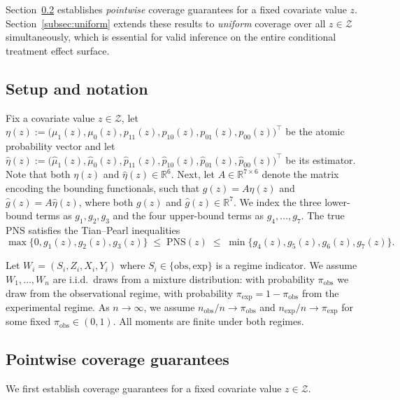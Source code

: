 \documentclass[accepted]{uai2026} %
\theoremstyle{plain}
\theoremstyle{definition}
\theoremstyle{remark}
\begin{document}
Section~\ref{subsec:pointwise} establishes \emph{pointwise} coverage guarantees
for a fixed covariate value $z$. Section~\ref{subsec:uniform} extends these
results to \emph{uniform} coverage over all $z \in \mathcal{Z}$ simultaneously,
which is essential for valid inference on the entire conditional treatment
effect surface.

\subsection{Setup and notation}

Fix a covariate value $z \in \mathcal{Z}$, let $\eta(z) := \bigl(\mu_1(z), \mu_0(z), p_{11}(z), p_{10}(z), p_{01}(z), p_{00}(z) \bigr)^\top$ be the atomic probability vector and let $\hat\eta(z) := \bigl(\hat\mu_1(z), \hat\mu_0(z), \hat p_{11}(z), \hat p_{10}(z), \hat p_{01}(z), \hat p_{00}(z) \bigr)^\top$ be its estimator. Note that both $\eta(z)$ and $\hat{\eta}(z)  \in \mathbb{R}^6$. Next, let $A \in \mathbb{R}^{7\times 6}$ denote the matrix encoding the
\citep[Eq.~(24)]{tian2000probabilities} bounding functionals, such that $g(z) = A\eta(z)$ and $\hat{g}(z) = A\hat{\eta}(z)$, where both $g(z)$ and $\hat{g}(z) \in \mathbb{R}^7$.
We index the three lower-bound terms as $g_1,g_2,g_3$ and the four upper-bound
terms as $g_4,\dots,g_7$. The true PNS satisfies the Tian--Pearl inequalities
\[
  \max\{0,g_1(z),g_2(z),g_3(z)\}
  \;\le\; \mathrm{PNS}(z)
  \;\le\;
  \min\{g_4(z),g_5(z),g_6(z),g_7(z)\}.
\]

Let $W_i = (S_i, Z_i, X_i, Y_i)$ where $S_i \in \{\text{obs}, \text{exp}\}$ is a regime indicator.
We assume $W_1,\dots,W_n$ are i.i.d.\ draws from a mixture distribution: with probability $\pi_{\mathrm{obs}}$ we draw from the observational regime, with probability $\pi_{\mathrm{exp}} = 1 - \pi_{\mathrm{obs}}$ from the experimental regime.
As $n \to \infty$, we assume $n_{\mathrm{obs}}/n \to \pi_{\mathrm{obs}}$ and $n_{\mathrm{exp}}/n \to \pi_{\mathrm{exp}}$ for some fixed $\pi_{\mathrm{obs}} \in (0,1)$.
All moments are finite under both regimes.

\subsection{Pointwise coverage guarantees}
\label{subsec:pointwise}

We first establish coverage guarantees for a fixed covariate value $z \in \mathcal{Z}$.
\end{document}
